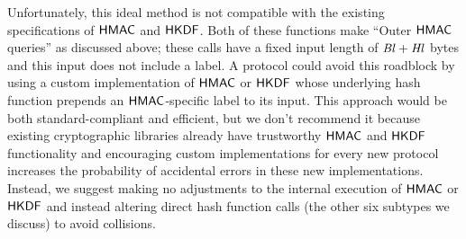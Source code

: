 Unfortunately, this ideal method is not compatible with the existing specifications of $\mathsf{HMAC}$ and $\mathsf{HKDF}$. 
Both of these functions make ``Outer $\mathsf{HMAC}$ queries'' as discussed above; these calls have a fixed input length of $\mathit{Bl}+ \mathit{Hl}$ bytes and this input does not include a label.
A protocol could avoid this roadblock by using a custom implementation of $\mathsf{HMAC}$ or $\mathsf{HKDF}$ whose underlying hash function prepends an $\mathsf{HMAC}$-specific label to its input.
This approach would be both standard-compliant and efficient, but we don't recommend it because existing cryptographic libraries already have trustworthy $\mathsf{HMAC}$ and $\mathsf{HKDF}$ functionality and encouraging custom implementations for every new protocol increases the probability of accidental errors in these new implementations.
Instead, we suggest making no adjustments to the internal execution of $\mathsf{HMAC}$ or $\mathsf{HKDF}$ and instead altering direct hash function calls (the other six subtypes we discuss) to avoid collisions.

